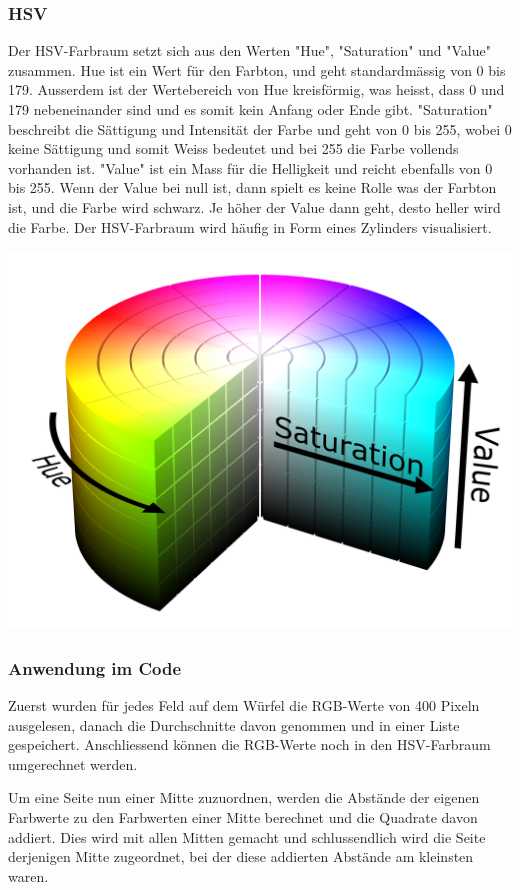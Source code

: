\documentclass[a4paper, 12pt]{article}
\begin{document}
\subsubsection{HSV}
Der HSV-Farbraum setzt sich aus den Werten "Hue", "Saturation" und "Value" zusammen. Hue ist ein Wert für den Farbton, und geht standardmässig von 0 bis 179. Ausserdem ist der Wertebereich von Hue kreisförmig, was heisst, dass 0 und 179 nebeneinander sind und es somit kein Anfang oder Ende gibt. "Saturation" beschreibt die Sättigung und Intensität der Farbe und geht von 0 bis 255, wobei 0 keine Sättigung und somit Weiss bedeutet und bei 255 die Farbe vollends vorhanden ist. "Value" ist ein Mass für die Helligkeit und reicht ebenfalls von 0 bis 255. Wenn der Value bei null ist, dann spielt es keine Rolle was der Farbton ist, und die Farbe wird schwarz. Je höher der Value dann geht, desto heller wird die Farbe. Der HSV-Farbraum wird häufig in Form eines Zylinders visualisiert.

\includegraphics[scale=0.07]{HSV_Zylinder} 
\subsubsection{Anwendung im Code}

Zuerst wurden für jedes Feld auf dem Würfel die RGB-Werte von 400 Pixeln ausgelesen, danach die Durchschnitte davon genommen und in einer Liste gespeichert. Anschliessend können die RGB-Werte noch in den HSV-Farbraum umgerechnet werden. 

Um eine Seite nun einer Mitte zuzuordnen, werden die Abstände der eigenen Farbwerte zu den Farbwerten einer Mitte berechnet und die Quadrate davon addiert. Dies wird mit allen Mitten gemacht und schlussendlich wird die Seite derjenigen Mitte zugeordnet, bei der diese addierten Abstände am kleinsten waren.
\end{document}
